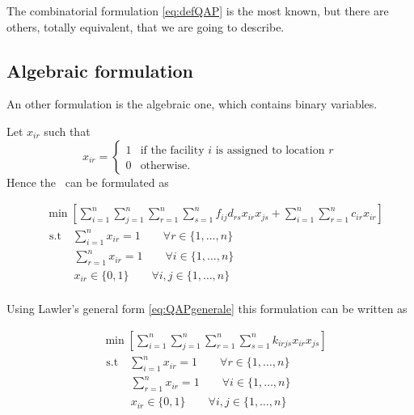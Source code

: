 The combinatorial formulation \eqref{eq:defQAP} is the most known, but there are others, totally equivalent, that we are going to describe.
\subsection{Algebraic formulation}
An other formulation is the algebraic one, which contains binary variables.

Let $x_{ir}$ such that
\[
x_{ir}=\begin{cases}
1 & \text{if the facility $i$ is assigned to location $r$}\\
0 & \text{otherwise.}
\end{cases}\]
Hence the \QAP \ can be formulated as
\begin{tcolorbox}[title=Algebraic formulation]
\begin{equation}
\label{eq:defQAP2}
\begin{split}
&\min{\left[\sum_{i=1}^n\sum_{j=1}^n\sum_{r=1}^n\sum_{s=1}^nf_{ij}d_{rs}x_{ir}x_{js}+\sum_{i=1}^n\sum_{r=1}^n c_{ir} x_{ir}\right]}\\
&\text{ s.t} \quad  \sum_{i=1}^n x_{ir} = 1 \qquad \forall r\in \{1,\dots,n\}\\
&\phantom{\text{ s.a}} \quad  \sum_{r=1}^n x_{ir} = 1 \qquad \forall i\in \{1,\dots,n\}\\
&\phantom{\text{ s.a}} \quad  x_{ir}\in \{0,1\} \qquad \forall i,j\in \{1,\dots,n\} \\
\end{split}
\end{equation}
\end{tcolorbox}

Using Lawler's general form \eqref{eq:QAPgenerale} this formulation can be written as
\begin{tcolorbox}[title=Algebraic formulation in Lawler's form]
\begin{equation}
\label{eq:defQAP2Generale}
\begin{split}
&\min{\left[\sum_{i=1}^n\sum_{j=1}^n\sum_{r=1}^n\sum_{s=1}^nk_{irjs}x_{ir}x_{js}\right]}\\
&\text{ s.t} \quad  \sum_{i=1}^n x_{ir} = 1 \qquad \forall r\in \{1,\dots,n\}\\
&\phantom{\text{ s.a}} \quad  \sum_{r=1}^n x_{ir} = 1 \qquad \forall i\in \{1,\dots,n\}\\
&\phantom{\text{ s.a}} \quad  x_{ir}\in \{0,1\} \qquad \forall i,j\in \{1,\dots,n\}\\
\end{split}
\end{equation}
\end{tcolorbox}


